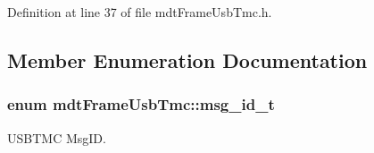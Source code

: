Definition at line 37 of file mdtFrameUsbTmc.h.



\subsection{Member Enumeration Documentation}
\hypertarget{classmdt_frame_usb_tmc_a10c2216157b0616b69f6cabc5c8e253b}{
\subsubsection[{msg\_\-id\_\-t}]{\setlength{\rightskip}{0pt plus 5cm}enum {\bf mdtFrameUsbTmc::msg\_\-id\_\-t}}}
\label{classmdt_frame_usb_tmc_a10c2216157b0616b69f6cabc5c8e253b}


USBTMC MsgID. 

